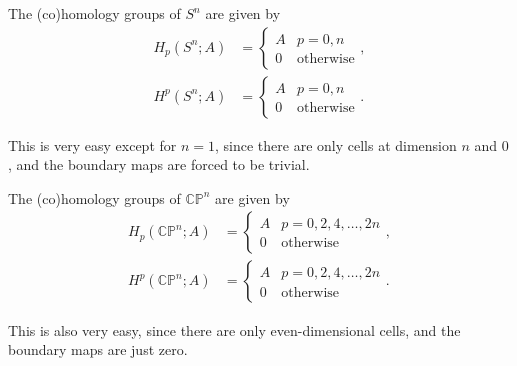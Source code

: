 \documentclass[12pt]{article}
\numberwithin{equation}{section}
\theoremstyle{remark}
\def\CP{\mathbb{CP}}
\begin{document}
\begin{example}
The (co)homology groups of $S^n$ are given by \begin{align}
H_p(S^n;A) &= \begin{cases} A & p=0,n \\ 0 & \text{otherwise} \end{cases}, \\
H^p(S^n;A) &= \begin{cases} A & p=0,n \\ 0 & \text{otherwise} \end{cases}.
\end{align}
\end{example}
This is very easy except for $n=1$, since there are only cells at dimension $n$ and $0$,
and the boundary maps are forced to be trivial.

\begin{example}
  \label{ex:cohoCPn}
The (co)homology groups of $\CP^n$ are given by \begin{align}
H_p(\CP^n;A) &= \begin{cases} A & p=0,2,4,\ldots,2n \\ 0 & \text{otherwise} \end{cases}, \\
H^p(\CP^n;A) &= \begin{cases} A & p=0,2,4,\ldots,2n \\ 0 & \text{otherwise} \end{cases}.
\end{align}
\end{example}
This is also very easy, since there are only even-dimensional cells,
and the boundary maps are just zero.
\end{document}
